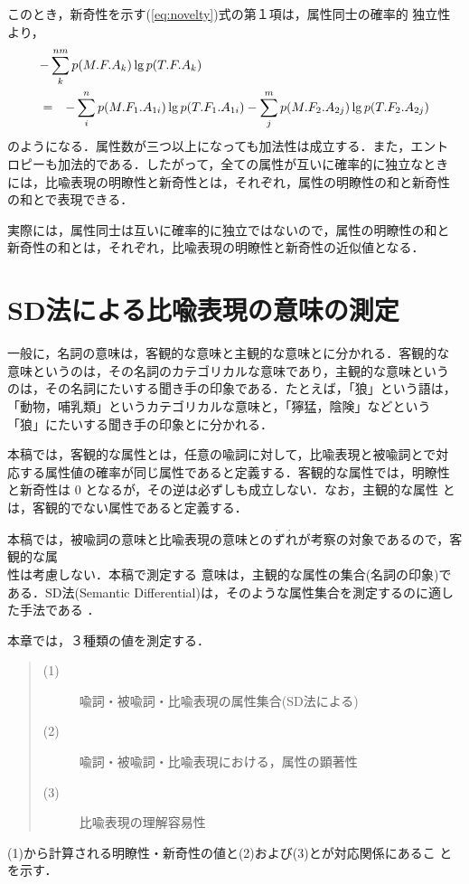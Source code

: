 このとき，新奇性を示す(\ref{eq:novelty})式の第１項は，属性同士の確率的
独立性より，
\begin{eqnarray}
  \lefteqn{-\sum_{k}^{nm}p(M.F.A_{k}) \lg p(T.F.A_{k})} \nonumber \\
  &=& -\sum_{i}^{n}p(M.F_1.A_{1i})\lg p(T.F_1.A_{1i}) - \sum_{j}^{m}p(M.F_2.A_{2j}) \lg p(T.F_2.A_{2j}) \nonumber
\end{eqnarray}
のようになる．属性数が三つ以上になっても加法性は成立する．また，エント
ロピーも加法的である．したがって，全ての属性が互いに確率的に独立なとき
には，比喩表現の明瞭性と新奇性とは，それぞれ，属性の明瞭性の和と新奇性
の和とで表現できる．

実際には，属性同士は互いに確率的に独立ではないので，属性の明瞭性の和と
新奇性の和とは，それぞれ，比喩表現の明瞭性と新奇性の近似値となる．

\section{SD法による比喩表現の意味の測定}
\label{sec:sd}
一般に，名詞の意味は，客観的な意味と主観的な意味とに分かれる．客観的な
意味というのは，その名詞のカテゴリカルな意味であり，主観的な意味という
のは，その名詞にたいする聞き手の印象である．たとえば，「狼」という語は，
「動物，哺乳類」というカテゴリカルな意味と，「獰猛，陰険」などという
「狼」にたいする聞き手の印象とに分かれる\cite{Yamanashi88}．

本稿では，客観的な属性とは，任意の喩詞に対して，比喩表現と被喩詞とで対
応する属性値の確率が同じ属性であると定義する．客観的な属性では，明瞭性
と新奇性は 0 となるが，その逆は必ずしも成立しない．なお，主観的な属性
とは，客観的でない属性であると定義する．

本稿では，被喩詞の意味と比喩表現の意味との$\dot{\mbox{ず}}\dot{\mbox
{れ}}$が考察の対象であるので，客観的な属\\性は考慮しない．本稿で測定する
意味は，主観的な属性の集合(名詞の印象)である．SD法(Semantic
Differential)は，そのような属性集合を測定するのに適した手法である
\cite{Osgood57}．

本章では，３種類の値を測定する．
\begin{quote}
  \begin{description}
  \item[(1)] 喩詞・被喩詞・比喩表現の属性集合(SD法による)
  \item[(2)] 喩詞・被喩詞・比喩表現における，属性の顕著性
  \item[(3)] 比喩表現の理解容易性
  \end{description}
\end{quote}
(1)から計算される明瞭性・新奇性の値と(2)および(3)とが対応関係にあるこ
とを示す．

